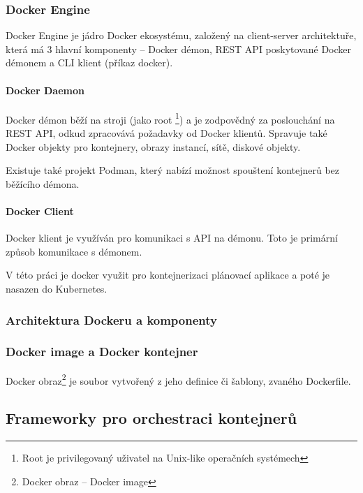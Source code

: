 \documentclass[thesis=M,czech]{FITthesis}[2019/12/23]
\theoremstyle{plain}
\theoremstyle{definition}
\begin{document}
\subsubsection{Docker Engine}

Docker Engine je jádro Docker ekosystému, založený na client-server architektuře, která má 3 hlavní komponenty -- Docker démon, REST API poskytované Docker démonem a CLI klient (příkaz docker).

\paragraph{Docker Daemon}

Docker démon běží na stroji (jako root \footnote{Root je privilegovaný uživatel na Unix-like operačních systémech}) a je zodpovědný za poslouchání na REST API, odkud zpracovává požadavky od Docker klientů. Spravuje také Docker objekty pro kontejnery, obrazy instancí, sítě, diskové objekty.


Existuje také projekt Podman, který nabízí možnost spouštení kontejnerů bez běžícího démona. 

\paragraph{Docker Client}

Docker klient je využíván pro komunikaci s API na démonu. Toto je primární způsob komunikace s démonem.


V této práci je docker využit pro kontejnerizaci plánovací aplikace a poté je nasazen do Kubernetes.




\subsubsection{Architektura Dockeru a komponenty}


\subsubsection{Docker image a Docker kontejner}


Docker obraz\footnote{Docker obraz -- Docker image} je soubor vytvořený z jeho definice či šablony, zvaného Dockerfile.  

\subsection{Frameworky pro orchestraci kontejnerů}
\end{document}
